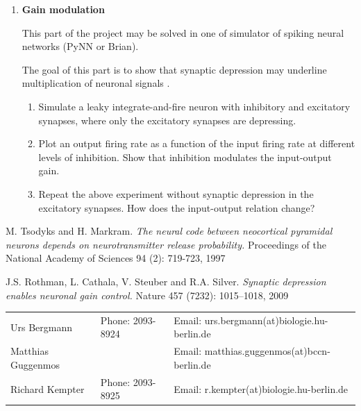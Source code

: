\documentclass[12pt]{article}
\begin{document}
\begin{enumerate}
    \item \textbf{Gain modulation}

        This part of the project may be solved in one of simulator of
        spiking neural networks (PyNN or Brian).

The goal of this part is to show that synaptic depression may
underline multiplication of neuronal signals \citep{Rothman09}.

\begin{enumerate}
\item Simulate a leaky integrate-and-fire neuron with inhibitory and
    excitatory synapses, where only the excitatory synapses are
    depressing.

\item Plot an output firing rate as a function of the input firing
    rate at different levels of inhibition. Show that inhibition
    modulates the input-output gain.

\item Repeat the above experiment without synaptic depression in the
    excitatory synapses. How
    does the input-output relation change?
\end{enumerate}


\end{enumerate}


\begin{thebibliography}{9}

      M. Tsodyks and H. Markram. \emph{The neural code between neocortical
      pyramidal neurons depends on neurotransmitter release
      probability.} Proceedings of the National Academy of Sciences
      94 (2): 719-723, 1997

       J.S. Rothman, L. Cathala, V. Steuber  and R.A. Silver.
       \emph{Synaptic depression enables neuronal gain control.} Nature
       457 (7232): 1015--1018, 2009
      \end{thebibliography}


\vfill
\begin{tabular}{lll}
Urs Bergmann & Phone: 2093-8924 & Email:
urs.bergmann(at)biologie.hu-berlin.de \\
Matthias Guggenmos & & Email: matthias.guggenmos(at)bccn-berlin.de \\
Richard Kempter \hfill & Phone: 2093-8925 \hfill & Email:
r.kempter(at)biologie.hu-berlin.de \\
\end{tabular}
\end{document}
